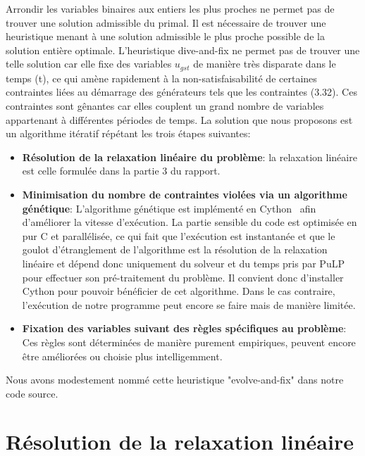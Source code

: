 \vspace*{1.2cm}

Arrondir les variables binaires aux entiers les plus proches ne permet pas de trouver une solution admissible
du primal. Il est nécessaire de trouver une heuristique menant à une solution admissible le plus proche possible
de la solution entière optimale. L'heuristique dive-and-fix ne permet pas de trouver une telle solution
car elle fixe des variables $u_{gst}$ de manière très disparate dans le temps (t), ce qui amène rapidement à la
non-satisfaisabilité de certaines contraintes liées au démarrage des générateurs tels que les contraintes (3.32).
Ces contraintes sont gênantes car elles couplent un grand nombre de variables appartenant à différentes
périodes de temps. La solution que nous proposons est un algorithme itératif répétant les trois étapes suivantes:
\begin{itemize}
    \item \textbf{Résolution de la relaxation linéaire du problème}: la relaxation linéaire est celle
    formulée dans la partie 3 du rapport.
    \item \textbf{Minimisation du nombre de contraintes violées via un algorithme génétique}:
    L'algorithme génétique est implémenté en Cython~\citep{behnel2010cython} afin d'améliorer la vitesse
    d'exécution. La partie sensible du code est optimisée en pur C et parallélisée, ce qui fait que l'exécution
    est instantanée et que le goulot d'étranglement de l'algorithme est la résolution de la relaxation linéaire
    et dépend donc uniquement du solveur et du temps pris par PuLP pour effectuer son pré-traitement du problème.
    Il convient donc d'installer Cython pour pouvoir bénéficier de cet algorithme. Dans le cas contraire,
    l'exécution de notre programme peut encore se faire mais de manière limitée.
    \item \textbf{Fixation des variables suivant des règles spécifiques au problème}:
    Ces règles sont déterminées de manière purement empiriques, peuvent encore être améliorées ou choisie
    plus intelligemment.
\end{itemize}
Nous avons modestement nommé cette heuristique "evolve-and-fix" dans notre code source.

\section{Résolution de la relaxation linéaire}

